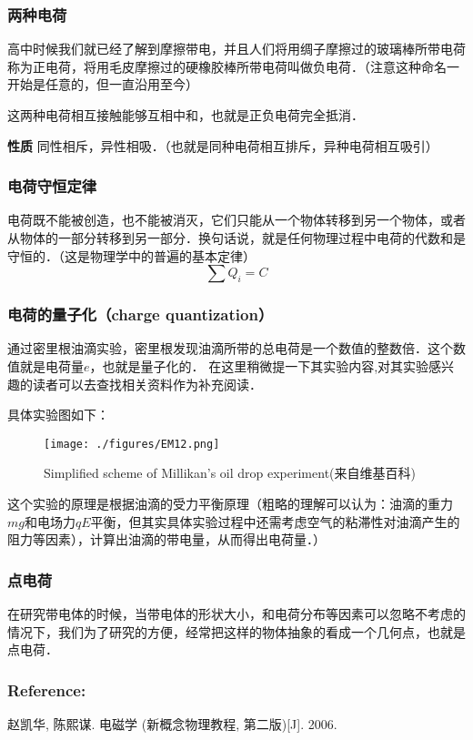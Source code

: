 
\subsubsection{两种电荷}
高中时候我们就已经了解到摩擦带电，并且人们将用绸子摩擦过的玻璃棒所带电荷称为正电荷，将用毛皮摩擦过的硬橡胶棒所带电荷叫做负电荷．（注意这种命名一开始是任意的，但一直沿用至今）

这两种电荷相互接触能够互相中和，也就是正负电荷完全抵消．

\textbf{性质} 同性相斥，异性相吸．（也就是同种电荷相互排斥，异种电荷相互吸引）

\subsubsection{电荷守恒定律}
电荷既不能被创造，也不能被消灭，它们只能从一个物体转移到另一个物体，或者从物体的一部分转移到另一部分．换句话说，就是任何物理过程中电荷的代数和是守恒的．（这是物理学中的普遍的基本定律）
\begin{equation}
\sum Q_i=C
\end{equation}

\subsubsection{电荷的量子化（charge quantization）}
 通过密里根油滴实验，密里根发现油滴所带的总电荷是一个数值的整数倍．这个数值就是电荷量$e$，也就是量子化的．
 在这里稍微提一下其实验内容,对其实验感兴趣的读者可以去查找相关资料作为补充阅读．

具体实验图如下：

\begin{figure}[ht]
\centering
\texttt{[image: ./figures/EM12.png]}
\caption{Simplified scheme of Millikan's oil drop experiment(来自维基百科)} \label{EM1_fig1}
\end{figure}

这个实验的原理是根据油滴的受力平衡原理（粗略的理解可以认为：油滴的重力$mg$和电场力$qE$平衡，但其实具体实验过程中还需考虑空气的粘滞性对油滴产生的阻力等因素），计算出油滴的带电量，从而得出电荷量．）

\subsubsection{点电荷}

在研究带电体的时候，当带电体的形状大小，和电荷分布等因素可以忽略不考虑的情况下，我们为了研究的方便，经常把这样的物体抽象的看成一个几何点，也就是点电荷．


\subsubsection{Reference:} 

赵凯华, 陈熙谋. 电磁学 (新概念物理教程, 第二版)[J]. 2006.


